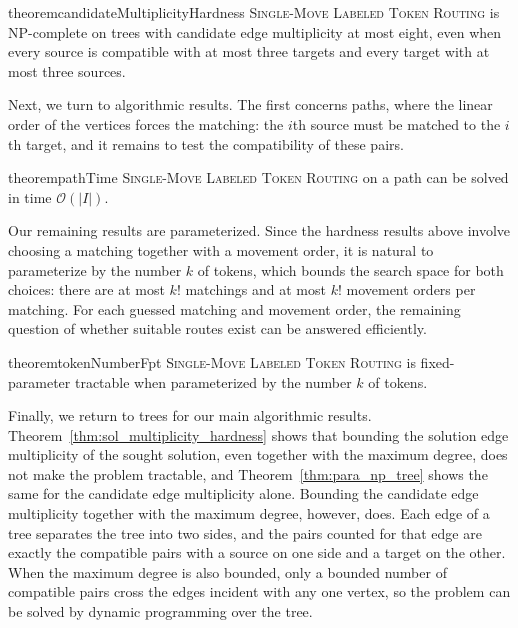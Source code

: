 \documentclass[a4paper,USenglish,thm-restate]{lipics-v2021}
\theoremstyle{problemstyle}
\begin{document}
\begin{restatable}{theorem}{candidateMultiplicityHardness}
\label{thm:para_np_tree}
\textsc{Single-Move Labeled Token Routing} is \textsf{NP}-complete on trees
with candidate edge multiplicity at most eight, even when every source is
compatible with at most three targets and every target with at most three
sources.
\end{restatable}

Next, we turn to algorithmic results. The first concerns paths, where the linear
order of the vertices forces the matching: the $i$th source must be matched
to the $i$th target, and it remains to test the compatibility of these
pairs.

\begin{restatable}{theorem}{pathTime}
\label{thm:path_time}
\textsc{Single-Move Labeled Token Routing} on a path can be solved in time
$\mathcal{O}(|I|)$.
\end{restatable}

Our remaining results are parameterized. Since the hardness results above
involve choosing a matching together with a movement order, it is natural to
parameterize by the number $k$ of tokens, which bounds the search space for both
choices: there are at most $k!$ matchings and at most $k!$ movement orders per
matching. For
each guessed matching and movement order, the remaining question of whether
suitable routes exist can be answered efficiently.

\begin{restatable}{theorem}{tokenNumberFpt}
\label{thm:token_number_fpt}
\textsc{Single-Move Labeled Token Routing} is fixed-parameter tractable when
parameterized by the number $k$ of tokens.
\end{restatable}

Finally, we return to trees for our main algorithmic results.
Theorem~\ref{thm:sol_multiplicity_hardness} shows that bounding the solution
edge multiplicity of the sought solution, even together with the maximum
degree, does not make the
problem tractable, and Theorem~\ref{thm:para_np_tree} shows the same for the
candidate edge multiplicity alone. Bounding the candidate edge multiplicity
together with the maximum degree, however, does. Each edge of a tree
separates the tree into two sides, and the pairs counted for that edge are
exactly the compatible pairs with a source on one side and a target on the
other. When the maximum degree is also bounded, only a bounded number of
compatible pairs cross the edges incident with any one vertex, so the
problem can be solved by dynamic programming over the tree.
\end{document}
